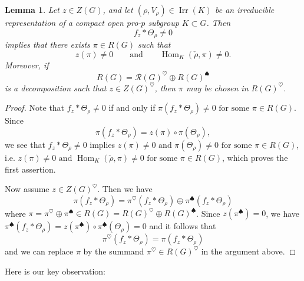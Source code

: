 \documentclass[12pt]{amsart}
\newtheorem{lemma}[thm]{Lemma}
\theoremstyle{definition}
\numberwithin{equation}{section}
\theoremstyle{remark}
\newcommand{\on}{\operatorname}
\newcommand{\Irr}{\operatorname{Irr}}
\begin{document}
    \begin{lemma}\label{projector}
Let $z\in Z(G)$, and let $(\rho,V_\rho)\in\Irr(K)$ be an irreducible representation of a compact open pro-$p$ subgroup $K\subset G$. Then
\[
f_z*\Theta_\rho\neq 0
\]
implies that there exists $\pi\in R(G)$ such that
\[
z(\pi)\neq 0
\qquad\text{and}\qquad
\operatorname{Hom}_K(\check\rho,\pi)\neq 0.
\]
Moreover, if
\[
R(G)=\mathcal R(G)^{\heartsuit}\oplus
 R(G)^{\spadesuit}
\]
is a decomposition such that $z\in Z(G)^{\heartsuit}$, then $\pi$ may be chosen in $ R(G)^{\heartsuit}$.
\end{lemma}
\begin{proof}
Note that  $f_z*\Theta_\rho\neq0$
if and only if 
$\pi(f_z*\Theta_\rho)\neq0
\text{\ for some\ } \pi\in R(G)$.
Since \[\pi(f_z*\Theta_\rho)=z(\pi)\circ\pi(\Theta_\rho),\] we see that 
$f_z*\Theta_\rho\neq0$
implies  
 $z(\pi)\neq 0\text{ and } \pi(\Theta_\rho)\neq 0
\text{ for some } \pi\in R(G)$,
 i.e. $z(\pi)\neq 0\text{ and } \operatorname{Hom}_K(\check\rho,\pi)\neq 0 \text{\ for some\ } \pi\in R(G)$, which proves the first assertion.

Now assume $z\in Z(G)^\heartsuit$.
Then 
 we have 
\[\pi(f_z*\Theta_\rho)=\pi^\heartsuit(f_z*\Theta_\rho)\oplus\pi^\spadesuit(f_z*\Theta_\rho)\] 
where $\pi=\pi^\heartsuit\oplus\pi^\spadesuit\in R(G)=R(G)^\heartsuit\oplus R(G)^\spadesuit$.
Since  $z(\pi^\spadesuit)=0$, we have  $\pi^\spadesuit(f_z*\Theta_\rho)=z(\pi^\spadesuit)\circ\pi^\spadesuit(\Theta_\rho)=0$ and it follows that 
\[\pi^{\heartsuit}(f_z*\Theta_\rho)=\pi(f_z*\Theta_\rho)\]
and we can replace $\pi$ by the summand $\pi^\heartsuit\in R(G)^\heartsuit$
in the argument above. 
\end{proof}





Here is our key observation:
\end{document}
